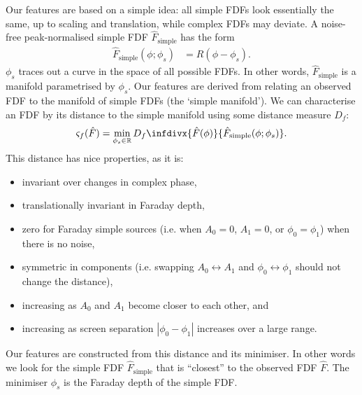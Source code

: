     Our features are based on a simple idea: all simple FDFs look essentially the same, up to scaling and translation, while complex FDFs may deviate. A noise-free peak-normalised simple FDF $\hat F_{\mathrm{simple}}$ has the form
    \begin{align}
        \label{eq:faraday-f-simple}
        \hat F_{\mathrm{simple}}(\phi; \phi_s) &= R(\phi - \phi_s).
    \end{align}
    $\phi_s$ traces out a curve in the space of all possible FDFs. In other words, $\hat F_{\mathrm{simple}}$ is a manifold parametrised by $\phi_s$. Our features are derived from relating an observed FDF to the manifold of simple FDFs (the `simple manifold'). We can characterise an FDF by its distance to the simple manifold using some distance measure $D_f$:
    \begin{equation}
        \label{eq:faraday-complexity-model}
        \varsigma_f(\hat F) = \min_{\phi_s \in \mathbb{R}} D_f\infdivx{\hat F(\phi)}{\hat F_{\mathrm{simple}}(\phi; \phi_s)}.
    \end{equation}
    This distance has nice properties, as it is:
    \begin{itemize}
        \item invariant over changes in complex phase,
        \item translationally invariant in Faraday depth,
        \item zero for Faraday simple sources (i.e. when $A_0 = 0$, $A_1 = 0$, or $\phi_0 = \phi_1$) when there is no noise,
        \item symmetric in components (i.e. swapping $A_0 \leftrightarrow A_1$ and $\phi_0 \leftrightarrow \phi_1$ should not change the distance),
        \item increasing as $A_0$ and $A_1$ become closer to each other, and
        \item increasing as screen separation $|\phi_0 - \phi_1|$ increases over a large range.
    \end{itemize}
    Our features are constructed from this distance and its minimiser. In other words
    we look for the simple FDF $\hat{F}_{\mathrm{simple}}$ that is ``closest'' to the observed FDF $\hat{F}$.
    The minimiser $\phi_s$ is the Faraday depth of the simple FDF.

